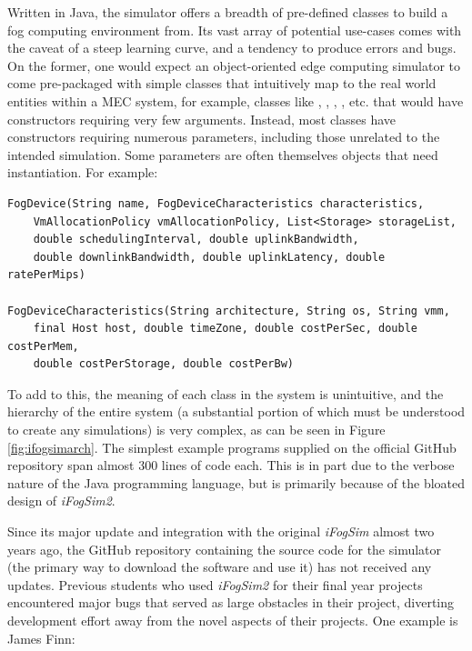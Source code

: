 \documentclass[]{UCD_CS_FYP_Report}
\begin{document}
Written in Java, the simulator offers a breadth of pre-defined classes to build a fog computing environment from. Its vast array of potential use-cases comes with the caveat of a steep learning curve, and a tendency to produce errors and bugs. On the former, one would expect an object-oriented edge computing simulator to come pre-packaged with simple classes that intuitively map to the real world entities within a MEC system, for example, classes like , , , , etc. that would have constructors requiring very few arguments. Instead, most classes have constructors requiring numerous parameters, including those unrelated to the intended simulation. Some parameters are often themselves objects that need instantiation. For example:
\vspace{-0.75em}
\begin{verbatim}
FogDevice(String name, FogDeviceCharacteristics characteristics,
    VmAllocationPolicy vmAllocationPolicy, List<Storage> storageList, 
    double schedulingInterval, double uplinkBandwidth, 
    double downlinkBandwidth, double uplinkLatency, double ratePerMips)

FogDeviceCharacteristics(String architecture, String os, String vmm,
    final Host host, double timeZone, double costPerSec, double costPerMem,
    double costPerStorage, double costPerBw)
\end{verbatim}

To add to this, the meaning of each class in the system is unintuitive, and the hierarchy of the entire system (a substantial portion of which must be understood to create any simulations) is very complex, as can be seen in Figure \ref{fig:ifogsimarch}. The simplest example programs supplied on the official GitHub repository span almost 300 lines of code each. This is in part due to the verbose nature of the Java programming language, but is primarily because of the bloated design of \textit{iFogSim2}.

Since its major update and integration with the original \textit{iFogSim} almost two years ago, the GitHub repository containing the source code for the simulator (the primary way to download the software and use it) has not received any updates. Previous students who used \textit{iFogSim2} for their final year projects encountered major bugs that served as large obstacles in their project, diverting development effort away from the novel aspects of their projects. One example is James Finn:
\end{document}
